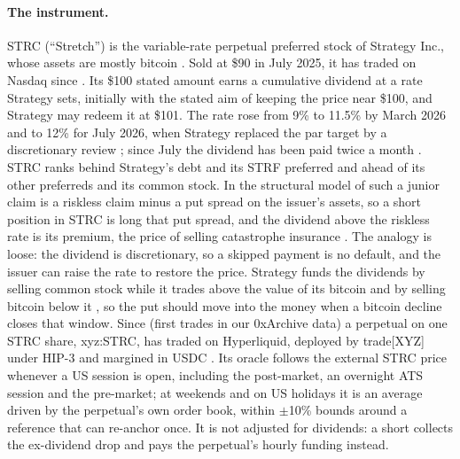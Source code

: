 \documentclass[10pt,a4paper]{article}
\begin{document}
\paragraph{The instrument.} STRC (``Stretch'') is the variable-rate perpetual preferred stock of Strategy Inc., whose assets are mostly bitcoin \citep{strategy2025strc}. Sold at \$90 in July 2025, it has traded on Nasdaq since \StrcIpo. Its \$100 stated amount earns a cumulative dividend at a rate Strategy sets, initially with the stated aim of keeping the price near \$100, and Strategy may redeem it at \$101. The rate rose from 9\% to 11.5\% by March 2026 \citep{strategy2026rate} and to 12\% for July 2026, when Strategy replaced the par target by a discretionary review \citep{strategy2026framework}; since July the dividend has been paid twice a month \citep{strategy2026semimonthly}. STRC ranks behind Strategy's debt and its STRF preferred and ahead of its other preferreds and its common stock. In the structural model of \citet{merton1974pricing} such a junior claim is a riskless claim minus a put spread on the issuer's assets, so a short position in STRC is long that put spread, and the dividend above the riskless rate is its premium, the price of selling catastrophe insurance \citep{coval2009economic}. The analogy is loose: the dividend is discretionary, so a skipped payment is no default, and the issuer can raise the rate to restore the price. Strategy funds the dividends by selling common stock while it trades above the value of its bitcoin and by selling bitcoin below it \citep{strategy2025update}, so the put should move into the money when a bitcoin decline closes that window. Since \StrcListing{} (first trades in our 0xArchive data) a perpetual on one STRC share, xyz:STRC, has traded on Hyperliquid, deployed by trade[XYZ] under HIP-3 and margined in USDC \citep{tradexyz2026docs}. Its oracle follows the external STRC price whenever a US session is open, including the post-market, an overnight ATS session and the pre-market; at weekends and on US holidays it is an average driven by the perpetual's own order book, within $\pm$10\% bounds around a reference that can re-anchor once. It is not adjusted for dividends: a short collects the ex-dividend drop and pays the perpetual's hourly funding instead.
\end{document}
